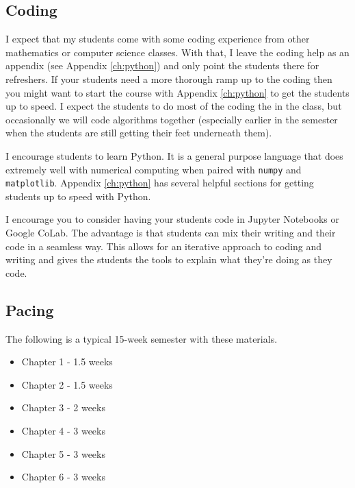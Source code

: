 \documentclass[
]{book}
\providecommand{\tightlist}{%
  \setlength{\itemsep}{0pt}\setlength{\parskip}{0pt}}
\theoremstyle{definition}
\theoremstyle{definition}
\theoremstyle{definition}
\theoremstyle{remark}
\begin{document}
\hypertarget{coding}{%
\subsection*{Coding}\label{coding}}

I expect that my students come with some coding experience from other
mathematics or computer science classes. With that, I leave the coding
help as an appendix (see Appendix \ref{ch:python}) and only point the students there for refreshers. If your students need a more thorough ramp up to the coding then you might want to start the course with Appendix \ref{ch:python} to get the students up to speed. I expect the
students to do most of the coding the in the class, but occasionally we
will code algorithms together (especially earlier in the semester when
the students are still getting their feet underneath them).

I encourage students to learn Python. It is a general purpose language that does extremely well with numerical computing when paired with \texttt{numpy} and
\texttt{matplotlib}. Appendix \ref{ch:python} has several helpful sections for getting students up to speed with Python.

I encourage you to consider having your students code in Jupyter
Notebooks or Google CoLab. The advantage is that students can mix their writing and their code in a seamless way. This allows for an iterative approach to coding and writing and gives the students the tools to explain what they're doing as they code.

\hypertarget{pacing}{%
\subsection*{Pacing}\label{pacing}}

The following is a typical 15-week semester with these materials.

\begin{itemize}
\tightlist
\item
  Chapter 1 - 1.5 weeks
\item
  Chapter 2 - 1.5 weeks
\item
  Chapter 3 - 2 weeks
\item
  Chapter 4 - 3 weeks
\item
  Chapter 5 - 3 weeks
\item
  Chapter 6 - 3 weeks
\end{itemize}
\end{document}

